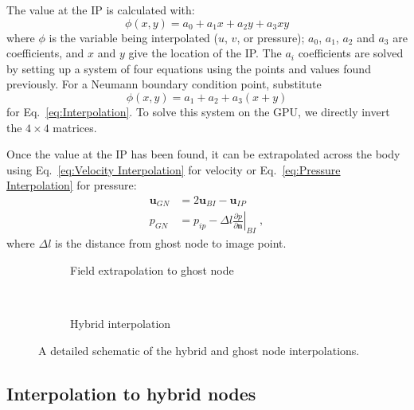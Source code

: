 \documentclass[onehalf,11pt]{beavtex}
\begin{document}
The value at the IP is calculated with:
\begin{equation}
\phi (x,y) = a_0 + a_1 x + a_2y + a_3 x y \label{eq:Interpolation}
\end{equation}
where $\phi$ is the variable being interpolated ($u$, $v$, or pressure); $a_0$, $a_1$, $a_2$ and $a_3$ are coefficients, and $x$ and $y$ give the location of the IP.
The $a_i$ coefficients are solved by setting up a system of four equations using the points and values found previously.
For a Neumann boundary condition point, substitute
\begin{equation}
\phi (x,y) = a_1 + a_2 + a_3 (x+y) \label{eq:Neumann Node}
\end{equation}
for Eq.~\eqref{eq:Interpolation}.
To solve this system on the GPU, we directly invert the $4 \times 4$ matrices.

Once the value at the IP has been found, it can be extrapolated across the body using Eq.~\eqref{eq:Velocity Interpolation} for velocity or Eq.~\eqref{eq:Pressure Interpolation} for pressure:
\begin{align}
\textbf{u}_{GN} &= 2\textbf{u}_{BI} - \textbf{u}_{IP} \label{eq:Velocity Interpolation} \\
p_{GN} &= p_{ip} - \Delta l \left. \frac{\partial p}{\partial \textbf{n}}\right|_{BI} \;, \label{eq:Pressure Interpolation}
\end{align}
where $\Delta l$ is the distance from ghost node to image point.

\begin{figure}[htb]
    \centering
    \begin{subfigure}{0.3\textwidth}
        \centering
        
        \caption{Field extrapolation to ghost node}
    \end{subfigure}
    ~
    \begin{subfigure}{0.3\textwidth}
        \centering
        
        \caption{Hybrid interpolation}
    \end{subfigure}
    \caption{A detailed schematic of the hybrid and ghost node interpolations.}
    \label{fig:Interpolate}
\end{figure}

\subsection{Interpolation to hybrid nodes}
\label{Sec:Interpolation}
\end{document}
